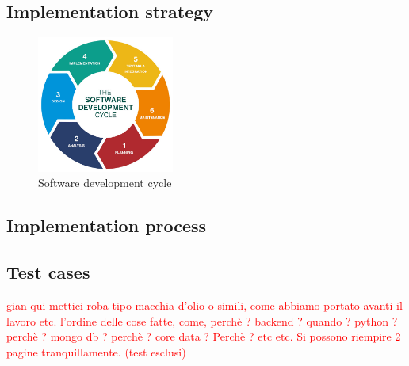\documentclass[paper=a4, fontsize=12pt]{scrartcl}
\numberwithin{equation}{section}		%
\numberwithin{figure}{section}			%
\numberwithin{table}{section}				%
\begin{document}
\subsection{Implementation strategy}
\begin{figure}[H]
\begin{center}
    \includegraphics[width=0.4\textwidth]{Implementation.jpg}
    \caption{Software development cycle}
    \label{implementation}
\end{center}
\end{figure}

\subsection{Implementation process}\label{section: Implementation process}
\subsection{Test cases}
\textcolor{red}{
    gian qui mettici roba tipo macchia d'olio o simili, come abbiamo portato avanti il lavoro etc. l'ordine delle cose fatte, come, perchè ? backend ? quando ? python ? perchè ? mongo db ? perchè ? core data ? Perchè ? etc etc. Si possono riempire 2 pagine tranquillamente.  (test esclusi)
}
\end{document}
